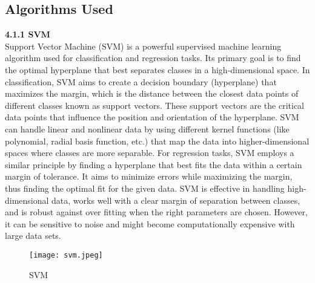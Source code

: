 \documentclass[12pt, English]{article}
\begin{document}
\subsection{Algorithms Used}
\textbf{4.1.1 SVM}\\
Support Vector Machine (SVM) is a powerful supervised machine learning
algorithm used for classification and regression tasks. Its primary goal is to find the optimal hyperplane that best separates classes in a high-dimensional space. In classification, SVM aims to create a decision boundary (hyperplane) that maximizes the margin, which is the distance between the closest data points of different classes known as support vectors. These support vectors are the critical data
points that influence the position and orientation of the hyperplane. SVM can handle linear and nonlinear data by using different kernel functions (like polynomial, radial basis function, etc.) that map the data into higher-dimensional spaces where classes are more separable. For regression tasks, SVM employs a similar principle by finding a hyperplane that best fits the data within a certain margin of tolerance. It aims to minimize errors while maximizing the margin, thus finding the optimal fit for the given data. SVM is effective in handling high-dimensional data, works well with a clear margin of separation between classes, and is robust against over fitting when the right parameters are chosen. However, it can be sensitive to noise
and might become computationally expensive with large data sets.
\\
\begin{figure}[htb]
\begin{center}
\texttt{[image: svm.jpeg]}
\end{center}
\begin{center}
\renewcommand{\thefigure}{4.1}
\caption{\footnotesize SVM }
\end{center}
\end{figure}
\end{document}
